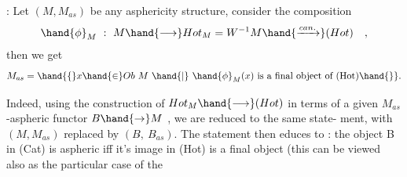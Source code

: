 \hand{\uline{\textcolor{black}{Corollary}}} :  Let $(M,M_{as})$ be any asphericity structure,  consider the
composition
\[ \hand{\phi}_M\ :\ M \hand{\longrightarrow} Hot_M = W^{-1}M \hand{\xrightarrow{can.}} (Hot) \quad , \]
then we get
\[ M_{as} = \hand{\{} x \hand{\in} Ob\ M \ \hand{|}\ \hand{\phi}_M(x) \text{ is a final object of (Hot)}\hand{\}}. \]

Indeed,  using the construction of  $Hot_M \hand{\longrightarrow} (Hot)$  in terms of a
given $M_{as}$-aspheric functor  $B \hand{\to} M$ ,  we are reduced to the same state-%
ment,  with $(M,M_{as})$  replaced by $(B\hat{},\ B\hat{}_{as})$.  The statement then educes
to :  the object B in (Cat)  is aspheric iff it's image in (Hot) is a
final object  (this can be viewed also as the particular case of the
